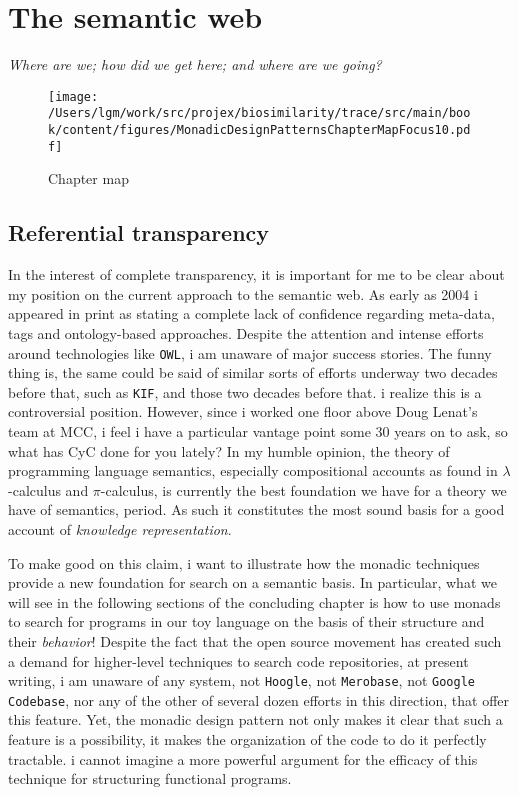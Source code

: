 

\chapter{The semantic web}
\begin{center}
{\small\em Where are we; how did we get here; and where are we going?}
\end{center}

\begin{figure}[tbp]
\begin{center}
{ \texttt{[image: /Users/lgm/work/src/projex/biosimilarity/trace/src/main/book/content/figures/MonadicDesignPatternsChapterMapFocus10.pdf]} }
\caption{ Chapter map }
\end{center}
\end{figure}

\section{Referential transparency}

In the interest of complete transparency, it is important for me to be
clear about my position on the current approach to the semantic
web. As early as 2004 i appeared in print as stating a complete lack
of confidence regarding meta-data, tags and ontology-based
approaches. Despite the attention and intense efforts around
technologies like \texttt{OWL}, i am unaware of major success
stories. The funny thing is, the same could be said of similar sorts
of efforts underway two decades before that, such as \texttt{KIF}, and
those two decades before that. i realize this is a controversial
position. However, since i worked one floor above Doug Lenat's team at
MCC, i feel i have a particular vantage point some 30 years on to ask,
so what has CyC done for you lately? In my humble opinion, the theory
of programming language semantics, especially compositional accounts
as found in $\lambda$-calculus and $\pi$-calculus, is currently the
best foundation we have for a theory we have of semantics, period.  As
such it constitutes the most sound basis for a good account of
\emph{knowledge representation}.

To make good on this claim, i want to illustrate how the monadic
techniques provide a new foundation for search on a semantic basis. In
particular, what we will see in the following sections of the
concluding chapter is how to use monads to search for programs in our
toy language on the basis of their structure and their
\emph{behavior}! Despite the fact that the open source movement has
created such a demand for higher-level techniques to search code
repositories, at present writing, i am unaware of any system, not
\texttt{Hoogle}, not \texttt{Merobase}, not \texttt{Google Codebase},
nor any of the other of several dozen efforts in this direction, that
offer this feature. Yet, the monadic design pattern not only makes it
clear that such a feature is a possibility, it makes the organization
of the code to do it perfectly tractable. i cannot imagine a more
powerful argument for the efficacy of this technique for structuring
functional programs.


